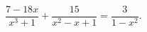 \begin{ex}[type=equation]
	\begin{condition}
		$\dfrac{7-18x}{x^3 + 1}+\dfrac{15}{x^2 - x + 1} = \dfrac{3}{1 - x^2}.$
	\end{condition}
\end{ex}